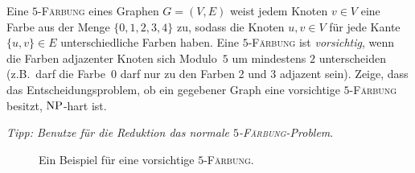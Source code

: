 \documentclass{uebung_cs}
\begin{document}
\begin{exercise}[\emoji{star}: Vorsichtige Färbung]
	Eine $5$-\textsc{Färbung} eines Graphen $G = (V,E)$ weist jedem Knoten $v \in V$ eine Farbe aus der Menge $\{0,1,2,3,4\}$ zu, sodass die Knoten $u,v \in V$ für jede Kante $\{u,v\} \in E$ unterschiedliche Farben haben. Eine $5$-\textsc{Färbung} ist \textit{vorsichtig}, wenn die Farben adjazenter Knoten sich Modulo~$5$ um mindestens $2$ unterscheiden (z.B.~darf die Farbe~0 darf nur zu den Farben 2 und 3 adjazent sein). Zeige, dass das Entscheidungsproblem, ob ein gegebener Graph eine vorsichtige $5$-\textsc{Färbung} besitzt, $\mathrm{NP}$-hart ist.
	
	\textit{Tipp: Benutze für die Reduktion das normale $5$-\textsc{Färbung}-Problem}.
	
	\begin{figure}[ht]
	\begin{center}
        \caption{Ein Beispiel für eine vorsichtige $5$-\textsc{Färbung}.}
	\end{center}
	\end{figure}
\end{exercise}
\end{document}
